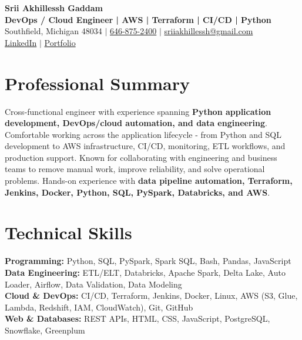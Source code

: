 \documentclass[letterpaper,10pt]{article}
\begin{document}
\fontsize{9.35pt}{10.45pt}\selectfont

\begin{center}
    {\LARGE \textbf{Srii Akhillessh Gaddam}} \\[-1pt]
    \textbf{DevOps / Cloud Engineer | AWS | Terraform | CI/CD | Python} \\[2pt]
    Southfield, Michigan 48034 $|$
    \href{tel:6468752400}{646-875-2400} $|$
    \href{mailto:sriiakhillessh@gmail.com}{sriiakhillessh@gmail.com} \\[1pt]
    \href{https://www.linkedin.com/in/srii-akhiilessh-gaddam-b48668191/}{LinkedIn} $|$
    \href{https://sriiakhillesshg.github.io/portfolio/}{Portfolio}
\end{center}
\vspace{-8pt}

\section{Professional Summary}
\small{Cross-functional engineer with experience spanning \textbf{Python application development, DevOps/cloud automation, and data engineering}. Comfortable working across the application lifecycle - from Python and SQL development to AWS infrastructure, CI/CD, monitoring, ETL workflows, and production support. Known for collaborating with engineering and business teams to remove manual work, improve reliability, and solve operational problems. Hands-on experience with \textbf{data pipeline automation, Terraform, Jenkins, Docker, Python, SQL, PySpark, Databricks, and AWS}.}

\section{Technical Skills}
\small{
\textbf{Programming:} Python, SQL, PySpark, Spark SQL, Bash, Pandas, JavaScript \\
\textbf{Data Engineering:} ETL/ELT, Databricks, Apache Spark, Delta Lake, Auto Loader, Airflow, Data Validation, Data Modeling \\
\textbf{Cloud \& DevOps:} CI/CD, Terraform, Jenkins, Docker, Linux, AWS (S3, Glue, Lambda, Redshift, IAM, CloudWatch), Git, GitHub \\
\textbf{Web \& Databases:} REST APIs, HTML, CSS, JavaScript, PostgreSQL, Snowflake, Greenplum
}
\end{document}
